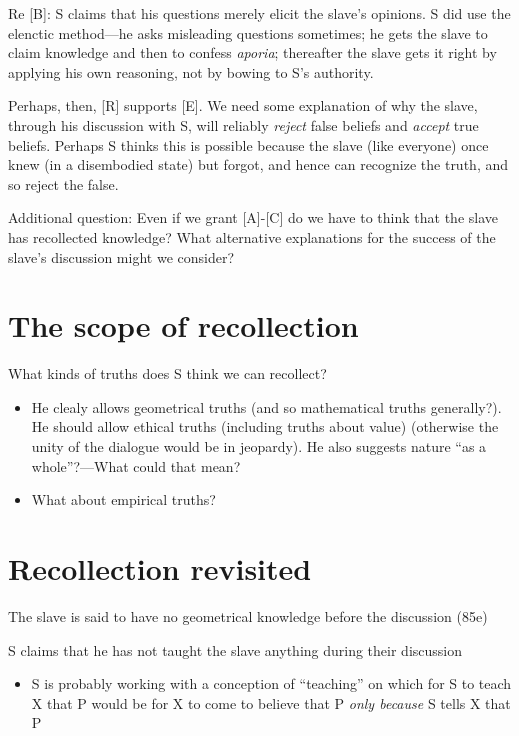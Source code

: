 \documentclass[10 pt]{article}
\begin{document}
\noindent Re [B]: S claims that his questions merely elicit the slave's opinions. S did use the elenctic method---he asks misleading questions sometimes; he gets the slave to claim knowledge and then to confess \emph{aporia}; thereafter the slave gets it right by applying his own reasoning, not by bowing to S's authority.
\vspace*{2mm}

\noindent Perhaps, then, [R] supports [E]. We need some explanation of why the slave, through his discussion with S, will reliably \emph{reject} false beliefs and \emph{accept} true beliefs. Perhaps S thinks this is possible because the slave (like everyone) once knew (in a disembodied state) but forgot, and hence can recognize the truth, and so reject the false.
\vspace*{2mm}

\noindent Additional question: Even if we grant [A]-[C] do we have to think that the slave has recollected knowledge? What alternative explanations for the success of the slave's discussion might we consider?

\section*{The scope of recollection}

\noindent What kinds of truths does S think we can recollect?

\begin{itemize}\item{He clealy allows geometrical truths (and so mathematical truths generally?). He should allow ethical truths (including truths about value) (otherwise the unity of the dialogue would be in jeopardy). He also suggests nature ``as a whole''?---What could that mean?}\item{What about empirical truths?}\end{itemize}

\section*{Recollection revisited}

\noindent [1] The slave is said to have no geometrical knowledge before the discussion (85e)
\vspace*{2mm}

\noindent [2] S claims that he has not taught the slave anything during their discussion
\begin{itemize}\item{S is probably working with a conception of ``teaching'' on which for S to teach X that P would be for X to come to believe that P \emph{only because} S tells X that P}\end{itemize}
\end{document}
